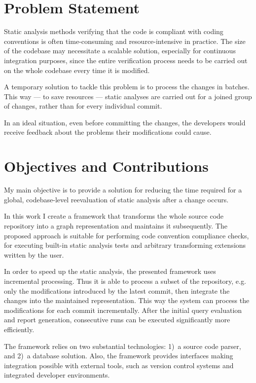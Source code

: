 \section{Problem Statement}

Static analysis methods verifying that the code is compliant with coding conventions is often time-consuming and resource-intensive in practice. The size of the codebase may necessitate a scalable solution, especially for continuous integration purposes, since the entire verification process needs to be carried out on the whole codebase every time it is modified.

A temporary solution to tackle this problem is to process the changes in batches. This way --- to save resources --- static analyses are carried out for a joined group of changes, rather than for every individual commit.

In an ideal situation, even before committing the changes, the developers would receive feedback about the problems their modifications could cause.


\section{Objectives and Contributions}

My main objective is to provide a solution for reducing the time required for a global, codebase-level reevaluation of static analysis after a change occurs.

In this work I create a framework that transforms the whole source code repository into a graph representation and maintains it subsequently. The proposed approach is suitable for performing code convention compliance checks, for executing built-in static analysis tests and arbitrary transforming extensions written by the user.

In order to speed up the static analysis, the presented framework uses incremental processing. Thus it is able to process a subset of the repository, e.g. only the modifications introduced by the latest commit, then integrate the changes into the maintained representation. This way the system can process the modifications for each commit incrementally. After the initial query evaluation and report generation, consecutive runs can be executed significantly more efficiently.

The framework relies on two substantial technologies: 1)~a source code parser, and 2)~a database solution. Also, the framework provides interfaces making integration possible with external tools, such as version control systems and integrated developer environments.


